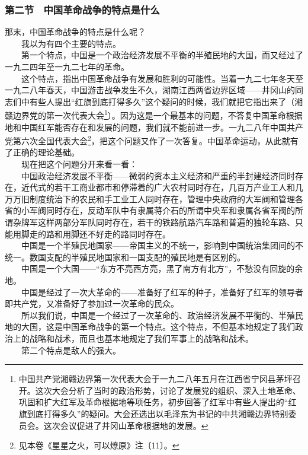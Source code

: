 \documentclass[cn,11pt,chinese]{elegantbook}
\def\myformat#1{\hfil\hfil #1}
\begin{document}
\subsubsection*{\myformat{第二节　中国革命战争的特点是什么}}
那末，中国革命战争的特点是什么呢？\\
　　我以为有四个主要的特点。\\
　　第一个特点，中国是一个政治经济发展不平衡的半殖民地的大国，而又经过了一九二四年至一九二七年的革命。\\
　　这个特点，指出中国革命战争有发展和胜利的可能性。当着一九二七年冬天至一九二八年春天，中国游击战争发生不久，湖南江西两省边界区域——井冈山的同志们中有些人提出“红旗到底打得多久”这个疑问的时候，我们就把它指出来了（湘赣边界党的第一次代表大会\footnote[12]{ 中国共产党湘赣边界第一次代表大会于一九二八年五月在江西省宁冈县茅坪召开。这次大会分析了当时的政治形势，讨论了发展党的组织、深入土地革命、巩固和扩大红军及革命根据地等项任务，初步回答了红军中有些人提出的“红旗到底打得多久”的疑问。大会还选出以毛泽东为书记的中共湘赣边界特别委员会。这次会议促进了井冈山革命根据地的发展。}）。因为这是一个最基本的问题，不答复中国革命根据地和中国红军能否存在和发展的问题，我们就不能前进一步。一九二八年中国共产党第六次全国代表大会\footnote[13]{ 见本卷《星星之火，可以燎原》注〔11〕。}，把这个问题又作了一次答复。中国革命运动，从此就有了正确的理论基础。\\
　　现在把这个问题分开来看一看：\\
　　中国政治经济发展不平衡——微弱的资本主义经济和严重的半封建经济同时存在，近代式的若干工商业都市和停滞着的广大农村同时存在，几百万产业工人和几万万旧制度统治下的农民和手工业工人同时存在，管理中央政府的大军阀和管理各省的小军阀同时存在，反动军队中有隶属蒋介石的所谓中央军和隶属各省军阀的所谓杂牌军这样两部分军队同时存在，若干的铁路航路汽车路和普遍的独轮车路、只能用脚走的路和用脚还不好走的路同时存在。\\
　　中国是一个半殖民地国家——帝国主义的不统一，影响到中国统治集团间的不统一。数国支配的半殖民地国家和一国支配的殖民地是有区别的。\\
　　中国是一个大国——“东方不亮西方亮，黑了南方有北方”，不愁没有回旋的余地。\\
　　中国是经过了一次大革命的——准备好了红军的种子，准备好了红军的领导者即共产党，又准备好了参加过一次革命的民众。\\
　　所以我们说，中国是一个经过了一次革命的、政治经济发展不平衡的、半殖民地的大国，这是中国革命战争的第一个特点。这个特点，不但基本地规定了我们政治上的战略和战术，而且也基本地规定了我们军事上的战略和战术。\\
　　第二个特点是敌人的强大。\\
\end{document}
